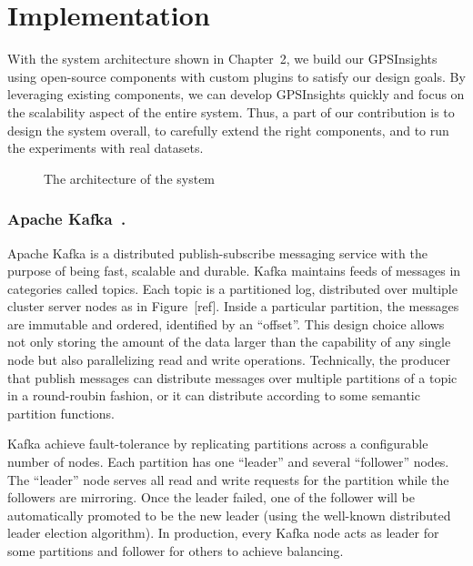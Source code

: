 \documentclass{acm_proc_article-sp}
\begin{document}
\section{Implementation} 

With the system architecture shown in Chapter~2, we build our GPSInsights using open-source components with custom plugins to satisfy our design goals. By leveraging existing components, we can develop GPSInsights quickly and focus on the scalability aspect of the entire system. Thus, a part of our contribution is to design the system overall, to carefully extend the right components, and to run the experiments with real datasets.  

\begin{figure}[h]
\centering
{}
\caption{The architecture of the system}
\end{figure}

\subsubsection{Apache Kafka~\cite{kafkapaper,kafkaweb}.} 

Apache Kafka is a distributed publish-subscribe messaging service with the purpose of being fast, scalable and durable. Kafka maintains feeds of messages in categories called topics. Each topic is a partitioned log, distributed over multiple cluster server nodes as in Figure~[ref]. Inside a particular partition, the messages are immutable and ordered, identified by an ``offset''. This design choice allows not only storing the amount of the data larger than the capability of any single node but also parallelizing read and write operations. Technically, the producer that publish messages can distribute messages over multiple partitions of a topic in a round-roubin fashion, or it can distribute according to some semantic partition functions.

Kafka achieve fault-tolerance by replicating partitions across a configurable number of nodes. Each partition has one ``leader'' and several ``follower'' nodes. The ``leader'' node serves all read and write requests for the partition while the followers are mirroring. Once the leader failed, one of the follower will be automatically promoted to be the new leader (using the well-known distributed leader election algorithm). In production, every Kafka node acts as leader for some partitions and follower for others to achieve balancing. 
\end{document}
